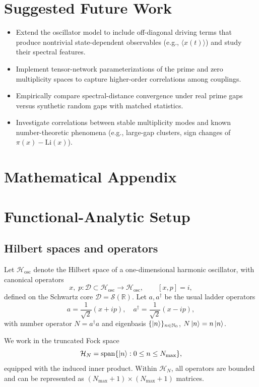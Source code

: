\documentclass[11pt]{article}
\begin{document}
\section{Suggested Future Work}

\begin{itemize}[nosep]
    \item Extend the oscillator model to include off-diagonal driving terms that produce nontrivial state-dependent observables (e.g., $\langle x(t)\rangle$) and study their spectral features.
    \item Implement tensor-network parameterizations of the prime and zero multiplicity spaces to capture higher-order correlations among couplings.
    \item Empirically compare spectral-distance convergence under real prime gaps versus synthetic random gaps with matched statistics.
    \item Investigate correlations between stable multiplicity modes and known number-theoretic phenomena (e.g., large-gap clusters, sign changes of $\pi(x)-\mathrm{Li}(x)$).
\end{itemize}

\appendix
\section*{Mathematical Appendix}

\section{Functional-Analytic Setup}

\subsection{Hilbert spaces and operators}

Let $\mathcal{H}_{\text{osc}}$ denote the Hilbert space of a one-dimensional harmonic oscillator, with canonical operators
\[
x,\; p:\mathcal{D} \subset \mathcal{H}_{\text{osc}} \to \mathcal{H}_{\text{osc}},\qquad [x,p]=i,
\]
defined on the Schwartz core $\mathcal{D} = \mathcal{S}(\mathbb{R})$. Let $a,a^\dagger$ be the usual ladder operators
\[
a = \frac{1}{\sqrt{2}}(x+ip),\quad a^\dagger = \frac{1}{\sqrt{2}}(x-ip),
\]
with number operator $N = a^\dagger a$ and eigenbasis $\{\ket{n}\}_{n\in\mathbb{N}_0}$, $N\ket{n}=n\ket{n}$.

We work in the truncated Fock space
\[
\mathcal{H}_N = \operatorname{span}\{\ket{n} : 0\le n\le N_{\max}\},
\]
equipped with the induced inner product. Within $\mathcal{H}_N$, all operators are bounded and can be represented as $(N_{\max}+1)\times (N_{\max}+1)$ matrices.
\end{document}
